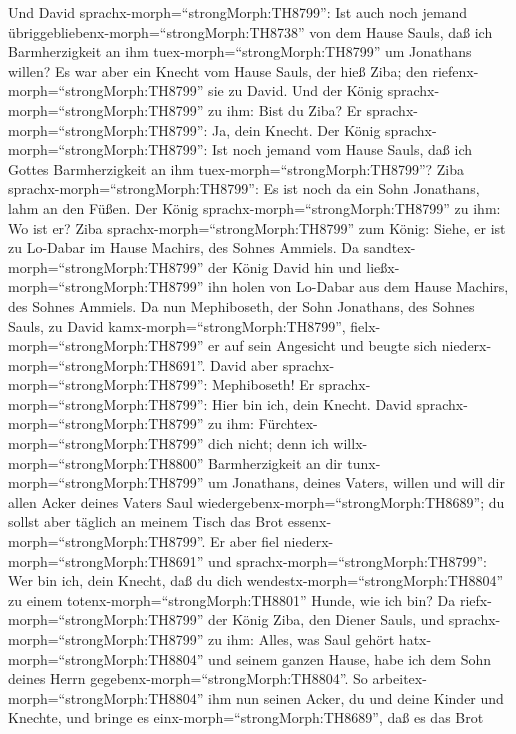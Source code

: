  Und David sprachx-morph=``strongMorph:TH8799'': Ist auch
noch jemand übriggebliebenx-morph=``strongMorph:TH8738'' von dem Hause
Sauls, daß ich Barmherzigkeit an ihm tuex-morph=``strongMorph:TH8799''
um Jonathans willen?  Es war aber ein Knecht vom Hause
Sauls, der hieß Ziba; den riefenx-morph=``strongMorph:TH8799'' sie zu
David. Und der König sprachx-morph=``strongMorph:TH8799'' zu ihm: Bist
du Ziba? Er sprachx-morph=``strongMorph:TH8799'': Ja, dein Knecht.
 Der König sprachx-morph=``strongMorph:TH8799'': Ist noch
jemand vom Hause Sauls, daß ich Gottes Barmherzigkeit an ihm
tuex-morph=``strongMorph:TH8799''? Ziba
sprachx-morph=``strongMorph:TH8799'': Es ist noch da ein Sohn Jonathans,
lahm an den Füßen.  Der König
sprachx-morph=``strongMorph:TH8799'' zu ihm: Wo ist er? Ziba
sprachx-morph=``strongMorph:TH8799'' zum König: Siehe, er ist zu
Lo-Dabar im Hause Machirs, des Sohnes Ammiels.  Da
sandtex-morph=``strongMorph:TH8799'' der König David hin und
ließx-morph=``strongMorph:TH8799'' ihn holen von Lo-Dabar aus dem Hause
Machirs, des Sohnes Ammiels.  Da nun Mephiboseth, der Sohn
Jonathans, des Sohnes Sauls, zu David kamx-morph=``strongMorph:TH8799'',
fielx-morph=``strongMorph:TH8799'' er auf sein Angesicht und beugte sich
niederx-morph=``strongMorph:TH8691''. David aber
sprachx-morph=``strongMorph:TH8799'': Mephiboseth! Er
sprachx-morph=``strongMorph:TH8799'': Hier bin ich, dein Knecht.
 David sprachx-morph=``strongMorph:TH8799'' zu ihm:
Fürchtex-morph=``strongMorph:TH8799'' dich nicht; denn ich
willx-morph=``strongMorph:TH8800'' Barmherzigkeit an dir
tunx-morph=``strongMorph:TH8799'' um Jonathans, deines Vaters, willen
und will dir allen Acker deines Vaters Saul
wiedergebenx-morph=``strongMorph:TH8689''; du sollst aber täglich an
meinem Tisch das Brot essenx-morph=``strongMorph:TH8799''. 
Er aber fiel niederx-morph=``strongMorph:TH8691'' und
sprachx-morph=``strongMorph:TH8799'': Wer bin ich, dein Knecht, daß du
dich wendestx-morph=``strongMorph:TH8804'' zu einem
totenx-morph=``strongMorph:TH8801'' Hunde, wie ich bin?  Da
riefx-morph=``strongMorph:TH8799'' der König Ziba, den Diener Sauls, und
sprachx-morph=``strongMorph:TH8799'' zu ihm: Alles, was Saul gehört
hatx-morph=``strongMorph:TH8804'' und seinem ganzen Hause, habe ich dem
Sohn deines Herrn gegebenx-morph=``strongMorph:TH8804''. 
So arbeitex-morph=``strongMorph:TH8804'' ihm nun seinen Acker, du und
deine Kinder und Knechte, und bringe es
einx-morph=``strongMorph:TH8689'', daß es das Brot
